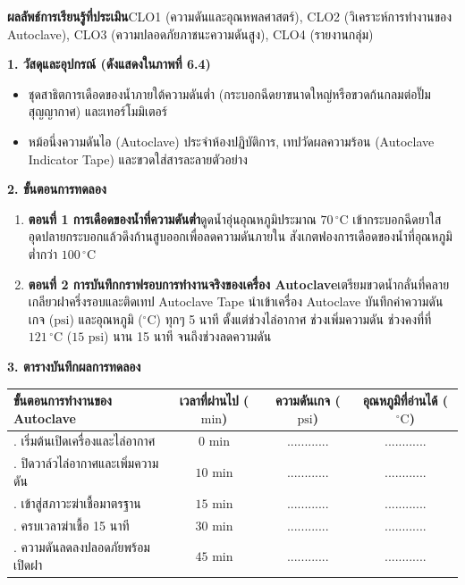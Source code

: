 \begin{labbox}
\noindent\textbf{ผลลัพธ์การเรียนรู้ที่ประเมิน}\quad CLO1 (ความดันและอุณหพลศาสตร์), CLO2 (วิเคราะห์การทำงานของ Autoclave), CLO3 (ความปลอดภัยภาชนะความดันสูง), CLO4 (รายงานกลุ่ม)

\vspace{4pt}
\noindent\textbf{1. วัสดุและอุปกรณ์ (ดังแสดงใน\mbox{ภาพที่} 6.4)}
\begin{itemize}
    \item ชุดสาธิตการเดือดของน้ำภายใต้ความดันต่ำ (กระบอกฉีดยาขนาดใหญ่หรือขวดก้นกลมต่อปั๊มสุญญากาศ) และเทอร์โมมิเตอร์
    \item หม้อนึ่งความดันไอ (Autoclave) ประจำห้องปฏิบัติการ, เทปวัดผลความร้อน (Autoclave Indicator Tape) และขวดใส่สารละลายตัวอย่าง
\end{itemize}

\noindent\textbf{2. ขั้นตอนการทดลอง}
\begin{enumerate}
    \item \textbf{ตอนที่ 1 การเดือดของน้ำที่ความดันต่ำ}\quad ดูดน้ำอุ่นอุณหภูมิประมาณ $70\,^\circ\text{C}$ เข้ากระบอกฉีดยาใส อุดปลายกระบอกแล้วดึงก้านสูบออกเพื่อลดความดันภายใน สังเกตฟองการเดือดของน้ำที่อุณหภูมิต่ำกว่า $100\,^\circ\text{C}$
    \item \textbf{ตอนที่ 2 การบันทึกกราฟรอบการทำงานจริงของเครื่อง Autoclave}\quad เตรียมขวดน้ำกลั่นที่คลายเกลียวฝาครึ่งรอบและติดเทป Autoclave Tape นำเข้าเครื่อง Autoclave บันทึกค่าความดันเกจ ($\text{psi}$) และอุณหภูมิ ($^\circ\text{C}$) ทุกๆ 5 นาที ตั้งแต่ช่วงไล่อากาศ ช่วงเพิ่มความดัน ช่วงคงที่ที่ $121\,^\circ\text{C}$ ($15\text{ psi}$) นาน 15 นาที จนถึงช่วงลดความดัน
\end{enumerate}

\noindent\textbf{3. ตารางบันทึกผลการทดลอง}
\begin{center}
\footnotesize\setlength{\tabcolsep}{3.5pt}
\begin{tabularx}{\linewidth}{>{\raggedright\arraybackslash}X c c c}
\toprule
\textbf{ขั้นตอนการทำงานของ Autoclave} & \textbf{เวลาที่ผ่านไป ($\text{min}$)} & \textbf{ความดันเกจ ($\text{psi}$)} & \textbf{อุณหภูมิที่อ่านได้ ($^\circ\text{C}$)} \\
\midrule
1. เริ่มต้นเปิดเครื่องและไล่อากาศ & $0\text{ min}$ & ............ & ............ \\
2. ปิดวาล์วไล่อากาศและเพิ่มความดัน & $10\text{ min}$ & ............ & ............ \\
3. เข้าสู่สภาวะฆ่าเชื้อมาตรฐาน & $15\text{ min}$ & ............ & ............ \\
4. ครบเวลาฆ่าเชื้อ 15 นาที & $30\text{ min}$ & ............ & ............ \\
5. ความดันลดลงปลอดภัยพร้อมเปิดฝา & $45\text{ min}$ & ............ & ............ \\
\bottomrule
\end{tabularx}
\end{center}
\end{labbox}

